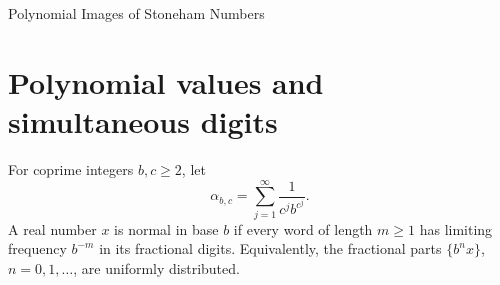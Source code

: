 \documentclass[11pt]{article}
\begin{document}
\begin{center}
{\LARGE Polynomial Images of Stoneham Numbers\par}
\medskip
{}
\end{center}
\begin{abstract}
For coprime integers \(b\ge2\) and \(c\ge2\) let
\(\alpha_{b,c}=\sum_{j\ge1}c^{-j}b^{-c^j}\). Mira Cult's public, unrefereed
notes S08 (2026, Theorem 1.1 and Corollaries 1.2--1.3) show that for
\(c>2\) every nonconstant rational polynomial in \(\alpha_{b,c}\) is normal
in base \(b\) and that the distinct powers of \(\alpha_{b,c}\) are jointly
normal. We give a complete kernel-verified Lean~4 proof of this ordinary
case; its arithmetic step is an inclusion--exclusion argument showing that
the leading prefix denominators lose only a bounded power of each prime
of \(c\). S08, Theorem 1.1(b), already gives an effective power saving
with an unspecified exponent; we give the explicit scalar exponent
\(\delta_d=1/(2(2^{d+1}-2))\) in degree \(d\).
At \(c=2\) and odd \(b\ge3\) we determine the prefix denominators of
\(\alpha_{b,2}^2\), prove its normality, and give a denominator criterion
for quadratics. A written transfer from exact finite certificates proves
normality of every rational polynomial of degree \(3\) through \(120\), of
degree \(128\), or of degree \(ep^r\) for sixteen pairs \((e,p)\) and
\(r\ge0\). We determine the least \(2\)-adic valuation of the leading mass
in every degree, and show that nonvanishing of this mass on a family of open
intervals of full measure would suffice in each degree. Normality of the
resonant quadratic \(\alpha_{b,2}^2-2\alpha_{b,2}\) remains open for every
odd radix \(b\ge3\).
\end{abstract}

\section{Polynomial values and simultaneous digits}
For coprime integers \(b,c\ge2\), let
\[
 \alpha_{b,c}=\sum_{j=1}^{\infty}\frac{1}{c^j b^{c^j}}.
\]
A real number \(x\) is normal in base \(b\) if every word of length \(m\ge1\)
has limiting frequency \(b^{-m}\) in its fractional digits. Equivalently,
the fractional parts \(\{b^nx\}\), \(n=0,1,\ldots\), are uniformly distributed.
\end{document}
